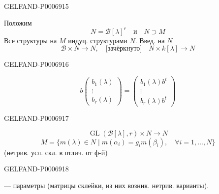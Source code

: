 \begin{GelfandAdjacentEvidence}{GELFAND-P000691}{5}


Положим
\[
N=\mathcal B[\lambda]^r\quad\text{и}\quad N\supset M
\]
Все структуры на \(M\) индуц. структурами \(N\). Введ. на \(N\)
\[
\mathcal B\times N\to N,\quad\text{[зачёркнуто]}\quad N\times k[\lambda]\to N
\]
\end{GelfandAdjacentEvidence}
\begin{GelfandAdjacentEvidence}{GELFAND-P000691}{6}

\[
b\begin{pmatrix}b_1(\lambda)\\\vdots\\b_r(\lambda)\end{pmatrix}
=\begin{pmatrix}b_1(\lambda)b^t\\\vdots\\b_r(\lambda)b^t\end{pmatrix}
\]
\end{GelfandAdjacentEvidence}
\begin{GelfandAdjacentEvidence}{GELFAND-P000691}{7}

\[
\operatorname{GL}(\mathcal B[\lambda],r)\times N\to N
\]
\[
M=\{m(\lambda)\in N\mid m(\alpha_i)=g_i m(\beta_i),
\quad\forall i=1,\ldots,N\}
\]
(нетрив. усл. скл. в отлич. от ф-й)

\end{GelfandAdjacentEvidence}
\begin{GelfandAdjacentEvidence}{GELFAND-P000691}{8}

--- параметры (матрицы склейки, из них возник. нетрив. варианты).

\end{GelfandAdjacentEvidence}
